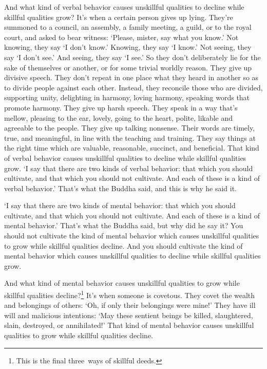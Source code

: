 \documentclass[12pt,openany]{book}%
\begin{document}
And what kind of verbal behavior causes unskillful qualities to decline while skillful qualities grow? It’s when a certain person gives up lying. They’re summoned to a council, an assembly, a family meeting, a guild, or to the royal court, and asked to bear witness: ‘Please, mister, say what you know.’ Not knowing, they say ‘I don’t know.’ Knowing, they say ‘I know.’ Not seeing, they say ‘I don’t see.’ And seeing, they say ‘I see.’ So they don’t deliberately lie for the sake of themselves or another, or for some trivial worldly reason. They give up divisive speech. They don’t repeat in one place what they heard in another so as to divide people against each other. Instead, they reconcile those who are divided, supporting unity, delighting in harmony, loving harmony, speaking words that promote harmony. They give up harsh speech. They speak in a way that’s mellow, pleasing to the ear, lovely, going to the heart, polite, likable and agreeable to the people. They give up talking nonsense. Their words are timely, true, and meaningful, in line with the teaching and training. They say things at the right time which are valuable, reasonable, succinct, and beneficial. That kind of verbal behavior causes unskillful qualities to decline while skillful qualities grow. ‘I say that there are two kinds of verbal behavior: that which you should cultivate, and that which you should not cultivate. And each of these is a kind of verbal behavior.’ That’s what the Buddha said, and this is why he said it. 

‘I say that there are two kinds of mental behavior: that which you should cultivate, and that which you should not cultivate. And each of these is a kind of mental behavior.’ That’s what the Buddha said, but why did he say it? You should not cultivate the kind of mental behavior which causes unskillful qualities to grow while skillful qualities decline. And you should cultivate the kind of mental behavior which causes unskillful qualities to decline while skillful qualities grow. 

And what kind of mental behavior causes unskillful qualities to grow while skillful qualities decline?\footnote{This is the final three ways of skillful deeds. } It’s when someone is covetous. They covet the wealth and belongings of others: ‘Oh, if only their belongings were mine!’ They have ill will and malicious intentions: ‘May these sentient beings be killed, slaughtered, slain, destroyed, or annihilated!’ That kind of mental behavior causes unskillful qualities to grow while skillful qualities decline. 
\end{document}
